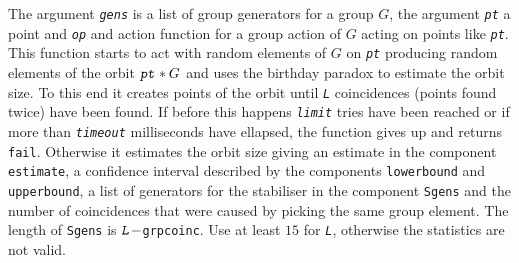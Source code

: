 \documentclass[a4paper,11pt]{report}
\begin{document}
{{{ The argument \mbox{\texttt{\mdseries\slshape gens}} is a list of group generators for a group $G$, the argument \mbox{\texttt{\mdseries\slshape pt}} a point and \mbox{\texttt{\mdseries\slshape op}} and action function for a group action of $G$ acting on points like \mbox{\texttt{\mdseries\slshape pt}}. This function starts to act with random elements of $G$ on \mbox{\texttt{\mdseries\slshape pt}} producing random elements of the orbit $\mbox{\texttt{\mdseries\slshape pt}}*G$ and uses the birthday paradox to estimate the orbit size. To this end it
creates points of the orbit until \mbox{\texttt{\mdseries\slshape L}} coincidences (points found twice) have been found. If before this happens \mbox{\texttt{\mdseries\slshape limit}} tries have been reached or if more than \mbox{\texttt{\mdseries\slshape timeout}} milliseconds have ellapsed, the function gives up and returns \texttt{fail}. Otherwise it estimates the orbit size giving an estimate in the component \texttt{estimate}, a confidence interval described by the components \texttt{lowerbound} and \texttt{upperbound}, a list of generators for the stabiliser in the component \texttt{Sgens} and the number of coincidences that were caused by picking the same group
element. The length of \texttt{Sgens} is $\mbox{\texttt{\mdseries\slshape L}}-$\texttt{grpcoinc}. Use at least $15$ for \mbox{\texttt{\mdseries\slshape L}}, otherwise the statistics are not valid. }

 }

  }

  
\end{document}
